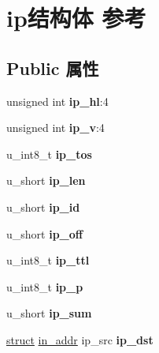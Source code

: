 \hypertarget{structip}{}\section{ip结构体 参考}
\label{structip}
\subsection*{Public 属性}
\begin{DoxyCompactItemize}
\item 
\mbox{\label{structip_ae1047e49b3843ff180171130296491a3}} 
unsigned int {\bfseries ip\+\_\+hl}\+:4
\item 
\mbox{\label{structip_a61fe163498c1e39812a62032070a828f}} 
unsigned int {\bfseries ip\+\_\+v}\+:4
\item 
\mbox{\label{structip_a0c063ac560b8b05beec12739f9b7ffd4}} 
u\+\_\+int8\+\_\+t {\bfseries ip\+\_\+tos}
\item 
\mbox{\label{structip_a9b922c0c4825305ad111de9a1d490999}} 
u\+\_\+short {\bfseries ip\+\_\+len}
\item 
\mbox{\label{structip_a39ffb0f3d854db34ce84722763494e3f}} 
u\+\_\+short {\bfseries ip\+\_\+id}
\item 
\mbox{\label{structip_aff8779cf5afee1aba77287abc6b3e647}} 
u\+\_\+short {\bfseries ip\+\_\+off}
\item 
\mbox{\label{structip_aec75b95b1d8d3b93273e4220bd2e5556}} 
u\+\_\+int8\+\_\+t {\bfseries ip\+\_\+ttl}
\item 
\mbox{\label{structip_a5e91d4d2a7ae243f37e4297b0dc795a9}} 
u\+\_\+int8\+\_\+t {\bfseries ip\+\_\+p}
\item 
\mbox{\label{structip_a834452d6936e01a21447abeb037d87ba}} 
u\+\_\+short {\bfseries ip\+\_\+sum}
\item 
\mbox{\label{structip_a68892eac9dc7a7e27aef51358f93324f}} 
\hyperlink{interfacestruct}{struct} \hyperlink{structin__addr}{in\+\_\+addr} ip\+\_\+src {\bfseries ip\+\_\+dst}
\item 

\end{DoxyCompactItemize}
